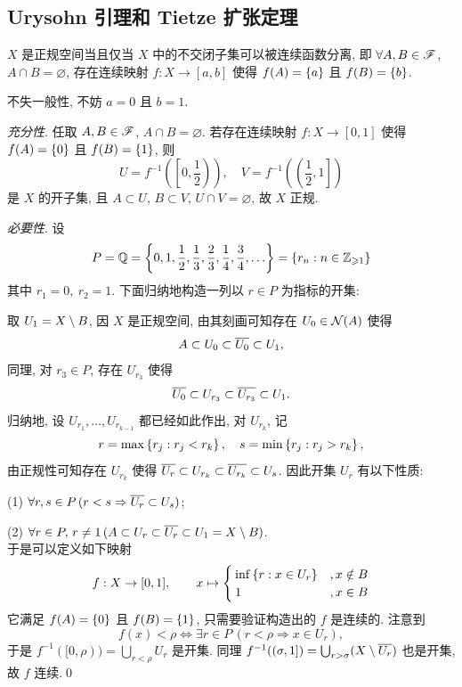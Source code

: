 \subsection{Urysohn 引理和 Tietze 扩张定理}

    \begin{Theorem}[Urysohn 引理]
        $ X $ 是正规空间当且仅当 $ X $ 中的不交闭子集可以被连续函数分离, 即 $ \forall A, B\in\SF $, $ A\cap B=\varnothing $, 存在连续映射 $ f : X\to [a,b] $ 使得 $ f(A)=\set{a} $ 且 $ f(B)=\set{b} $.
    \end{Theorem}
    \begin{Proof}
        不失一般性, 不妨 $ a=0 $ 且 $ b=1 $.

        \textsl{充分性}. 任取 $ A, B\in\SF $, $ A\cap B=\varnothing $. 若存在连续映射 $ f : X\to[0,1] $ 使得 $ f(A)=\set{0} $ 且 $ f(B)=\set{1} $, 则
        \[
            U=f^{-1}\left(\left[0,\frac{1}{2}\right)\right),\quad V=f^{-1}\left(\left(\frac{1}{2},1\right]\right)
        \]
        是 $ X $ 的开子集, 且 $ A\subset U $, $ B\subset V $, $ U\cap V=\varnothing $, 故 $ X $ 正规.

        \textsl{必要性}. 设
        \[
            P=\Q=\set{0,1,\frac{1}{2},\frac{1}{3},\frac{2}{3},\frac{1}{4},\frac{3}{4},\dots}=\set{r_n : n\in\Zi}
        \]
        其中 $ r_1=0,\ r_2=1 $. 下面归纳地构造一列以 $ r\in P $ 为指标的开集:

        取 $ U_1=X\sm B $, 因 $ X $ 是正规空间, 由其刻画可知存在 $ U_0\in\CN(A) $ 使得
        \[
            A\subset U_0\subset \baro{U_0}\subset U_1,
        \]
        同理, 对 $ r_3\in P $, 存在 $ U_{r_3} $ 使得
        \[
            \baro{U_0}\subset U_{r_3}\subset\baro{U_{r_3}}\subset U_1.
        \]
        归纳地, 设 $ U_{r_1},\dots,U_{r_{k-1}} $ 都已经如此作出, 对 $ U_{r_k} $, 记
        \[
            r=\max\set{r_j : r_j<r_k},\quad s=\min\set{r_j : r_j>r_k},
        \]
        由正规性可知存在 $ U_{r_k} $ 使得 $ \baro{U_r}\subset U_{r_k}\subset\baro{U_{r_k}}\subset U_s $. 因此开集 $ U_r $ 有以下性质:

        (1) $ \forall r,s\in P\,(r<s\Rightarrow\baro{U_r}\subset U_s) $;
        
        (2) $ \forall r\in P,\, r\ne 1\,(A\subset U_r\subset\baro{U_r}\subset U_1=X\sm B) $.\\
        于是可以定义如下映射
        \[
            f : X\to[0,1],\qquad x\mapsto\begin{cases}
                \inf\set{r : x\in U_r} & ,x\notin B\\ 1 &,x\in B
            \end{cases}
        \]
        它满足 $ f(A)=\set{0} $ 且 $ f(B)=\set{1} $, 只需要验证构造出的 $ f $ 是连续的. 注意到
        \[
            f(x)<\rho\Longleftrightarrow\exists r\in P\,(r<\rho\Rightarrow x\in U_r),
        \]
        于是 $ f^{-1}([0,\rho))=\bigcup_{r<\rho}U_r $ 是开集. 同理 $ f^{-1}((\sigma,1])=\bigcup_{r>\sigma}(X\sm\baro{U_r}) $ 也是开集, 故 $ f $ 连续.\qed
    \end{Proof}

